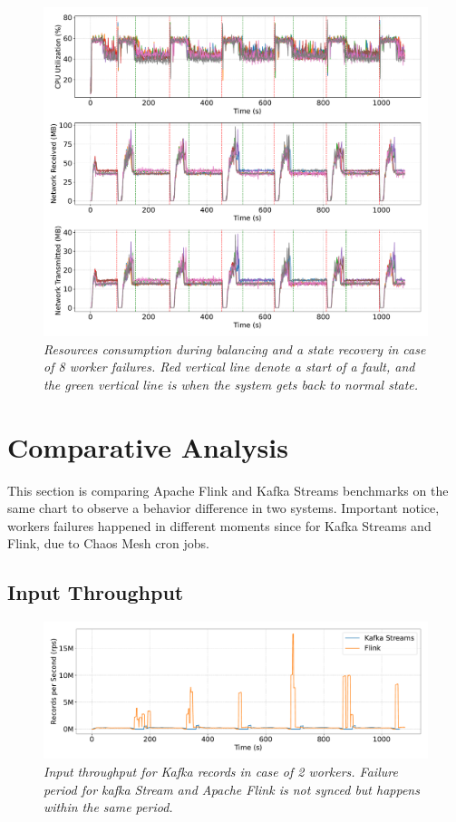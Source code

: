 \begin{figure}[H]
    \centering
    \includegraphics[width=1\textwidth]{figures/flink-8pods/flink_8_pods_resources}
    \caption{\textit{Resources consumption during balancing and a state recovery in case of 8 worker failures.
    Red vertical line denote a start of a fault, and the green vertical line is when the system gets back to normal state.}}
    \label{fig:flink-8pods-resource}
\end{figure}


\newpage
\section{Comparative Analysis}\label{subsec:comparative-analysis}
This section is comparing Apache Flink and Kafka Streams benchmarks
on the same chart to observe a behavior difference in two systems.
Important notice, workers failures happened in different moments since
for Kafka Streams and Flink, due to Chaos Mesh cron jobs.

\subsection{Input Throughput}\label{subsec:input-throughtput}

\begin{figure}[H]
    \centering
    \includegraphics[width=1\textwidth]{figures/kafka-flink/input-throughput-2pod-kafka-flink}
    \caption{\textit{Input throughput for Kafka records in case of 2 workers.
    Failure period for kafka Stream and Apache Flink is not synced but happens within the same period.}}
    \label{fig:kafka-flink-input-2}
\end{figure}


